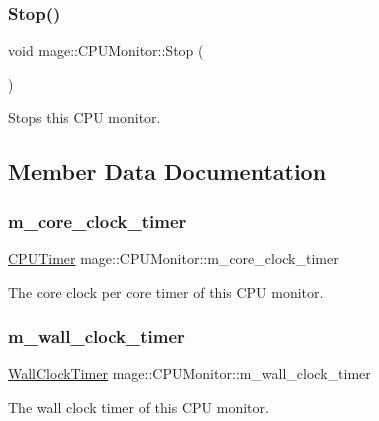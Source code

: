 \subsubsection{\texorpdfstring{Stop()}{Stop()}}
{\footnotesize\ttfamily void mage\+::\+C\+P\+U\+Monitor\+::\+Stop (\begin{DoxyParamCaption}{ }\end{DoxyParamCaption})\hspace{0.3cm}{\ttfamily [noexcept]}}

Stops this C\+PU monitor. 

\subsection{Member Data Documentation}
\mbox{\label{classmage_1_1_c_p_u_monitor_a245b920ef7e6703087b47ad370cb3bbb}} 
\subsubsection{\texorpdfstring{m\+\_\+core\+\_\+clock\+\_\+timer}{m\_core\_clock\_timer}}
{\footnotesize\ttfamily \mbox{\hyperlink{namespacemage_a1032d81f22079b7190cac3bf14136068}{C\+P\+U\+Timer}} mage\+::\+C\+P\+U\+Monitor\+::m\+\_\+core\+\_\+clock\+\_\+timer\hspace{0.3cm}{\ttfamily [private]}}

The core clock per core timer of this C\+PU monitor. \mbox{\label{classmage_1_1_c_p_u_monitor_ac1e3d7a7271515873a7a82a25eca4da2}} 
\subsubsection{\texorpdfstring{m\+\_\+wall\+\_\+clock\+\_\+timer}{m\_wall\_clock\_timer}}
{\footnotesize\ttfamily \mbox{\hyperlink{namespacemage_a06f4035ef59f07892e594bf1178a108a}{Wall\+Clock\+Timer}} mage\+::\+C\+P\+U\+Monitor\+::m\+\_\+wall\+\_\+clock\+\_\+timer\hspace{0.3cm}{\ttfamily [private]}}

The wall clock timer of this C\+PU monitor. 
